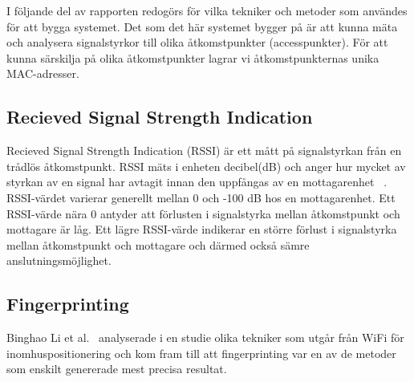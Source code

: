 \documentclass[a4paper,12pt]{article}
\begin{document}

 I följande del av rapporten redogörs för vilka tekniker och metoder som användes för att bygga systemet. Det som det här systemet bygger på är att kunna mäta och analysera signalstyrkor till olika åtkomstpunkter (accesspunkter). För att kunna särskilja på olika åtkomstpunkter lagrar vi åtkomstpunkternas unika MAC-adresser.

 \subsection{Recieved Signal Strength Indication}\label{RSSI}
 Recieved Signal Strength Indication (RSSI) är ett mått på signalstyrkan från en trådlös åtkomstpunkt. RSSI mäts i enheten decibel(dB) och anger hur mycket av styrkan av en signal har avtagit innan den uppfångas av en mottagarenhet ~\cite{RSSI_expl}. RSSI-värdet varierar generellt mellan 0 och -100 dB hos en mottagarenhet. Ett RSSI-värde nära 0 antyder att förlusten i signalstyrka mellan åtkomstpunkt och mottagare är låg. Ett lägre RSSI-värde indikerar en större förlust i signalstyrka mellan åtkomstpunkt och mottagare och därmed också sämre anslutningsmöjlighet.

 \subsection{Fingerprinting}\label{fingerprinting}

 Binghao Li et al.~\cite{IP1} analyserade i en studie  olika tekniker som utgår från WiFi för inomhuspositionering och kom fram till att fingerprinting var en av de metoder som enskilt genererade mest precisa resultat.
\end{document}
